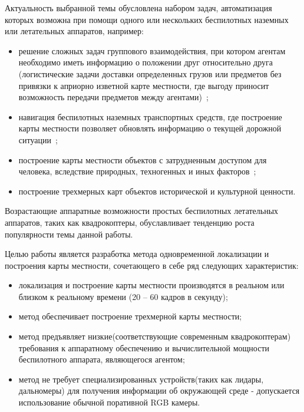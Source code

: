Актуальность выбранной темы обусловлена набором задач, автоматизация которых возможна при помощи одного или нескольких беспилотных наземных или летательных аппаратов, например:
\begin{itemize}
    \item решение сложных задач группового взаимодействия, при котором агентам необходимо иметь информацию о положении друг относительно друга (логистические задачи доставки определенных грузов или предметов без привязки к априорно изветной карте местности, где выгоду приносит возможность передачи предметов между агентами)~\cite{beerSLAM};
    \item навигация беспилотных наземных транспортных средств, где построение карты местности позволяет обновлять информацию о текущей дорожной ситуации~\cite{kittyDataset};
    \item построение карты местности объектов с затрудненным доступом для человека, вследствие природных, техногенных и иных факторов~\cite{tum3DMonoSLAM};
    \item построение трехмерных карт объектов исторической и культурной ценности.
\end{itemize}
Возрастающие аппаратные возможности простых беспилотных летательных аппаратов, таких как квадрокоптеры, обуславливает тенденцию роста~\cite{tum3DMonoSLAM} популярности темы данной работы.


Целью работы является разработка метода одновременной локализации и построения карты местности, сочетающего в себе ряд следующих характеристик:
\begin{itemize}
    \item локализация и построение карты местности производятся в реальном или близком к реальному времени (20 -- 60 кадров в секунду);
    \item метод обеспечивает построение трехмерной карты местности;
    \item метод предъявляет низкие(соответствующие современным квадрокоптерам) требования к аппаратному обеспечению и вычислительной мощности беспилотного аппарата, являющегося агентом;
    \item метод не требует специализированных устройств(таких как лидары, дальномеры) для получения информации об окружающей среде - допускается использование обычной поративной RGB камеры.
\end{itemize}
 

